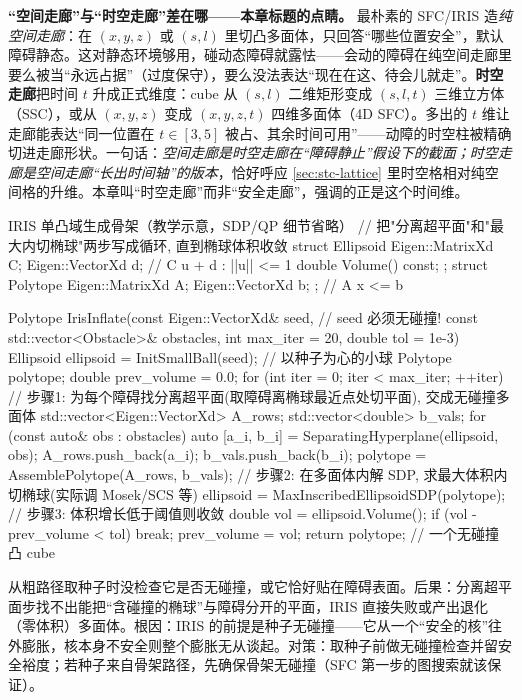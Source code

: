 \begin{insight}
\textbf{“空间走廊”与“时空走廊”差在哪——本章标题的点睛。}\;
最朴素的 SFC/IRIS 造\emph{纯空间走廊}：在 $(x,y,z)$ 或 $(s,l)$ 里切凸多面体，只回答“哪些位置安全”，默认障碍静态。这对静态环境够用，碰动态障碍就露怯——会动的障碍在纯空间走廊里要么被当“永远占据”（过度保守），要么没法表达“现在在这、待会儿就走”。\textbf{时空走廊}把时间 $t$ 升成正式维度：cube 从 $(s,l)$ 二维矩形变成 $(s,l,t)$ 三维立方体（SSC），或从 $(x,y,z)$ 变成 $(x,y,z,t)$ 四维多面体（4D SFC）。多出的 $t$ 维让走廊能表达“同一位置在 $t\in[3,5]$ 被占、其余时间可用”——动障的时空柱被精确切进走廊形状。一句话：\emph{空间走廊是时空走廊在“障碍静止”假设下的截面；时空走廊是空间走廊“长出时间轴”的版本}，恰好呼应 \cref{sec:stc-lattice} 里时空格相对纯空间格的升维。本章叫“时空走廊”而非“安全走廊”，强调的正是这个时间维。
\end{insight}

\begin{codebox}[C++]{IRIS 单凸域生成骨架（教学示意，SDP/QP 细节省略）}
// 把"分离超平面"和"最大内切椭球"两步写成循环, 直到椭球体积收敛
struct Ellipsoid { Eigen::MatrixXd C; Eigen::VectorXd d;   // {C u + d : ||u|| <= 1}
                   double Volume() const; };
struct Polytope  { Eigen::MatrixXd A; Eigen::VectorXd b; }; // A x <= b

Polytope IrisInflate(const Eigen::VectorXd& seed,           // seed 必须无碰撞!
                     const std::vector<Obstacle>& obstacles,
                     int max_iter = 20, double tol = 1e-3) {
  Ellipsoid ellipsoid = InitSmallBall(seed);     // 以种子为心的小球
  Polytope polytope; double prev_volume = 0.0;
  for (int iter = 0; iter < max_iter; ++iter) {
    // 步骤1: 为每个障碍找分离超平面(取障碍离椭球最近点处切平面), 交成无碰撞多面体
    std::vector<Eigen::VectorXd> A_rows; std::vector<double> b_vals;
    for (const auto& obs : obstacles) {
      auto [a_i, b_i] = SeparatingHyperplane(ellipsoid, obs);
      A_rows.push_back(a_i); b_vals.push_back(b_i);
    }
    polytope = AssemblePolytope(A_rows, b_vals);
    // 步骤2: 在多面体内解 SDP, 求最大体积内切椭球(实际调 Mosek/SCS 等)
    ellipsoid = MaxInscribedEllipsoidSDP(polytope);
    // 步骤3: 体积增长低于阈值则收敛
    double vol = ellipsoid.Volume();
    if (vol - prev_volume < tol) break;
    prev_volume = vol;
  }
  return polytope;                               // 一个无碰撞凸 cube
}
\end{codebox}

\begin{pitfall}
从粗路径取种子时没检查它是否无碰撞，或它恰好贴在障碍表面。后果：分离超平面步找不出能把“含碰撞的椭球”与障碍分开的平面，IRIS 直接失败或产出退化（零体积）多面体。根因：IRIS 的前提是种子无碰撞——它从一个“安全的核”往外膨胀，核本身不安全则整个膨胀无从谈起。对策：取种子前做无碰撞检查并留安全裕度；若种子来自骨架路径，先确保骨架无碰撞（SFC 第一步的图搜索就该保证）。
\end{pitfall}

